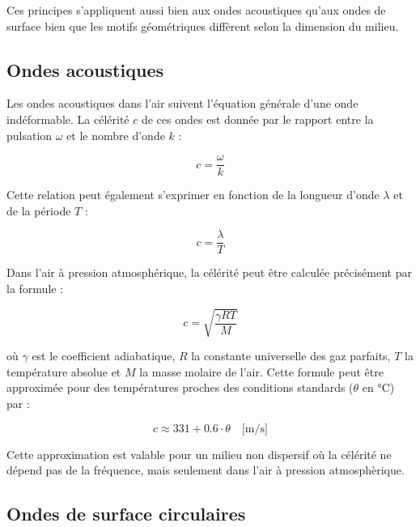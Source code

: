 Ces principes s'appliquent aussi bien aux ondes acoustiques qu'aux ondes de surface bien que les motifs géométriques diffèrent selon la dimension du milieu.

\subsection{Ondes acoustiques}
\label{subsec:acoustique}

Les ondes acoustiques dans l'air suivent l'équation générale d'une onde indéformable. La célérité \(c\) de ces ondes est donnée par le rapport entre la pulsation \(\omega\) et le nombre d'onde \(k\) :

\begin{equation}
    c = \frac{\omega}{k}
    \label{eq:c}
\end{equation}

Cette relation peut également s'exprimer en fonction de la longueur d'onde \(\lambda\) et de la période \(T\) :

\begin{equation}
    c = \frac{\lambda}{T}
    \label{eq:celerite2}
\end{equation}

Dans l'air à pression atmosphérique, la célérité peut être calculée précisément par la formule :

\begin{equation}
    c = \sqrt{\frac{\gamma R T}{M}}
    \label{eq:celerite_exacte}
\end{equation}

où \(\gamma\) est le coefficient adiabatique, \(R\) la constante universelle des gaz parfaits, \(T\) la température absolue et \(M\) la masse molaire de l'air. Cette formule peut être approximée pour des températures proches des conditions standards (\(\theta\) en °C) par :

\begin{equation}
    c \approx 331 + 0.6 \cdot \theta \quad \text{[m/s]}
    \label{eq:celerite_approx}
\end{equation}

Cette approximation est valable pour un milieu non dispersif où la célérité ne dépend pas de la fréquence, mais seulement dans l'air à pression atmosphèrique.

\subsection{Ondes de surface circulaires}
\label{subsec:surface}


